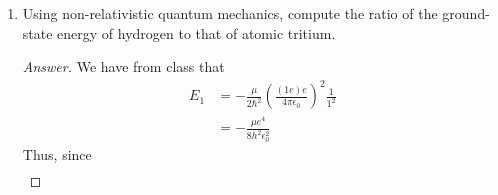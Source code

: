 \documentclass[../psets.tex]{subfiles}
\begin{document}
\begin{enumerate}
\begin{enumerate}
\begin{proof}[Answer]
\begin{align*}
                &= \left[ \frac{1}{3^9a_0^3}(16\sigma^4-288\sigma^3+1728\sigma^2-3888\sigma+2916)\e[-2\sigma/3] \right](a_0\sigma)^2\\
                &= \frac{1}{3^9a_0}(16\sigma^6-288\sigma^5+1728\sigma^4-3888\sigma^3+2916\sigma^2)\e[-2\sigma/3]
            \end{align*}
            so
            \begin{align*}
                0 ={}& \dv{\Prob(r)}{r}\\
                \begin{split}
                    ={}& \frac{1}{3^9a_0}(96\sigma^5-1440\sigma^4+6912\sigma^3-11664\sigma^2+5832\sigma)\e[-2\sigma/3]\\
                    &-\frac{2}{3^{10}a_0}(16\sigma^6-288\sigma^5+1728\sigma^4-3888\sigma^3+2916\sigma^2)\e[-2\sigma/3]
                \end{split}\\
                ={}& \frac{8}{3^{10}a_0}x(-4\sigma^5+108\sigma^4-972\sigma^3+3564\sigma^2-5103\sigma+2187)\e[-2\sigma/3]\\
                ={}& -4\sigma^5+108\sigma^4-972\sigma^3+3564\sigma^2-5103\sigma+2187
            \end{align*}
            Solving this polynomial for its zeroes, and knowing that the most probable distance is going to be the zero of greatest magnitude (orbital penetration peaks will necessarily be smaller than the farthest one out), we have that the the most probable distance is
            \begin{align*}
                \sigma &= 13.704\\
                \Aboxed{r &= 13.704a_0}
            \end{align*}
        \end{proof}
    \end{enumerate}
    \item Using non-relativistic quantum mechanics, compute the ratio of the ground-state energy of hydrogen to that of atomic tritium.
    \begin{proof}[Answer]
        We have from class that
        \begin{align*}
            E_1 &= -\frac{\mu}{2\hbar^2}\left( \frac{(1e)e}{4\pi\epsilon_0} \right)^2\frac{1}{1^2}\\
            &= -\frac{\mu e^4}{8h^2\epsilon_0^2}
        \end{align*}
        Thus, since
        \begin{align*}

\end{align*}
\end{proof}
\end{enumerate}
\end{document}
